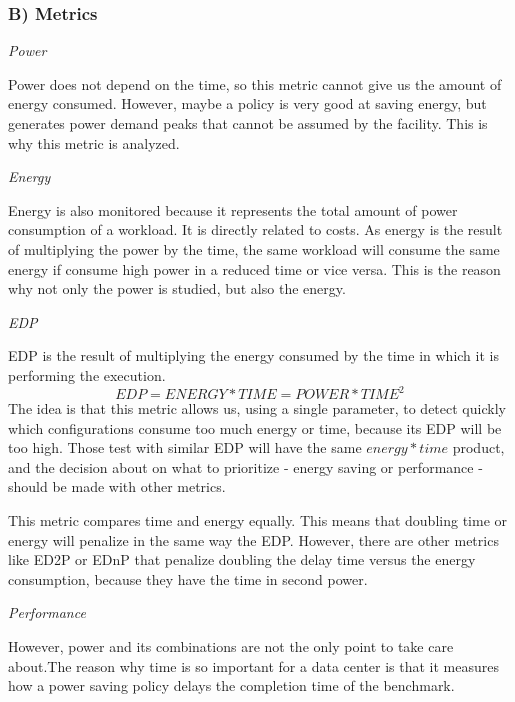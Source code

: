 \subsubsection{B) Metrics}
\emph{Power}

Power does not depend on the time, so this metric cannot give us the amount of energy consumed. However, maybe a policy is very good at saving energy, but generates power demand peaks that cannot be assumed by the facility. This is why this metric is analyzed.

\emph{Energy}

Energy is also monitored because it represents the total amount of power consumption of a workload. It is directly related to costs. As energy is the result of multiplying the power by the time, the same workload will consume the same energy if consume high power in a reduced time or vice versa. This is the reason why not only the power is studied, but also the energy.

\emph{EDP}

EDP is the result of multiplying the energy consumed by the time in which it is performing the execution.
\begin{equation*}
EDP = ENERGY * TIME = POWER * {TIME}^{2}
\end{equation*}
The idea is that this metric allows us, using a single parameter, to detect quickly which configurations consume too much energy or time, because its EDP will be too high. Those test with similar EDP will have the same $energy * time$ product, and the decision about on what to prioritize - energy saving or performance -  should be made with other metrics.

This metric compares time and energy equally. This means that doubling time or energy will penalize in the same way the EDP. However, there are other metrics like ED2P or EDnP that penalize doubling the delay time versus the energy consumption, because they have the time in second power. 

\emph{Performance}

However, power and its combinations are not the only point to take care about.The reason why time is so important for a data center is that it measures how a power saving policy delays the completion time of the benchmark. 

